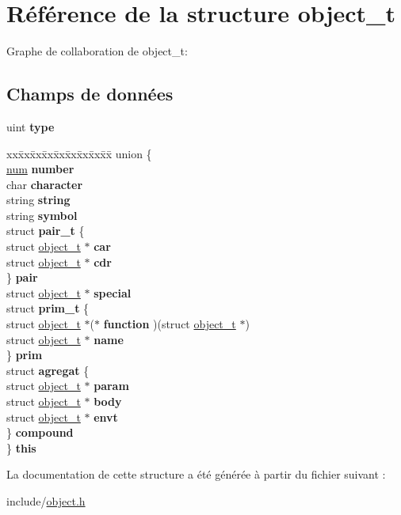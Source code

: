 \hypertarget{structobject__t}{}\section{Référence de la structure object\+\_\+t}
\label{structobject__t}


Graphe de collaboration de object\+\_\+t\+:
\subsection*{Champs de données}
\begin{DoxyCompactItemize}
\item 
uint {\bfseries type}\hypertarget{structobject__t_a92c5cda86022a69772cb8b6edba7530c}{}\label{structobject__t_a92c5cda86022a69772cb8b6edba7530c}

\item 
\begin{tabbing}
xx\=xx\=xx\=xx\=xx\=xx\=xx\=xx\=xx\=\kill
union \{\\
\>\hyperlink{structnum__t}{num} {\bfseries number}\\
\>char {\bfseries character}\\
\>string {\bfseries string}\\
\>string {\bfseries symbol}\\
\>struct {\bfseries pair\_t} \{\\
\>\>struct \hyperlink{structobject__t}{object\_t} $\ast$ {\bfseries car}\\
\>\>struct \hyperlink{structobject__t}{object\_t} $\ast$ {\bfseries cdr}\\
\>\} {\bfseries pair}\\
\>struct \hyperlink{structobject__t}{object\_t} $\ast$ {\bfseries special}\\
\>struct {\bfseries prim\_t} \{\\
\>\>struct \hyperlink{structobject__t}{object\_t} $\ast$($\ast$ {\bfseries function} )(struct \hyperlink{structobject__t}{object\_t} $\ast$)\\
\>\>struct \hyperlink{structobject__t}{object\_t} $\ast$ {\bfseries name}\\
\>\} {\bfseries prim}\\
\>struct {\bfseries agregat} \{\\
\>\>struct \hyperlink{structobject__t}{object\_t} $\ast$ {\bfseries param}\\
\>\>struct \hyperlink{structobject__t}{object\_t} $\ast$ {\bfseries body}\\
\>\>struct \hyperlink{structobject__t}{object\_t} $\ast$ {\bfseries envt}\\
\>\} {\bfseries compound}\\
\} {\bfseries this}\hypertarget{structobject__t_ace8394a5a873527066c787412642bef1}{}\label{structobject__t_ace8394a5a873527066c787412642bef1}
\\

\end{tabbing}\end{DoxyCompactItemize}


La documentation de cette structure a été générée à partir du fichier suivant \+:\begin{DoxyCompactItemize}
\item 
include/\hyperlink{object_8h}{object.\+h}\end{DoxyCompactItemize}
